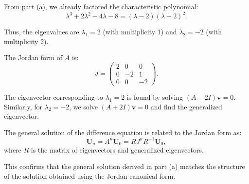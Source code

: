 \documentclass{article}
\renewcommand{\vec}[1]{\mathbf{#1}}
\begin{document}
\begin{enumerate}[(a)]
            From part (a), we already factored the characteristic polynomial:
            \[
            \lambda^3 + 2\lambda^2 - 4\lambda - 8 = (\lambda - 2)(\lambda + 2)^2.
            \]

            Thus, the eigenvalues are $\lambda_1 = 2$ (with multiplicity 1) and $\lambda_2 = -2$ (with multiplicity 2).

            The Jordan form of $A$ is:
            \[
            J = \begin{pmatrix}
            2 & 0 & 0 \\
            0 & -2 & 1 \\
            0 & 0 & -2
            \end{pmatrix}.
            \]

            The eigenvector corresponding to $\lambda_1 = 2$ is found by solving $(A - 2I)\vec{v} = 0$. Similarly, for $\lambda_2 = -2$, we solve $(A + 2I)\vec{v} = 0$ and find the generalized eigenvector.

            The general solution of the difference equation is related to the Jordan form as:
            \[
            \mathbf{U}_n = A^n \mathbf{U}_0 = RJ^n R^{-1} \mathbf{U}_0,
            \]
            where $R$ is the matrix of eigenvectors and generalized eigenvectors.

            This confirms that the general solution derived in part (a) matches the structure of the solution obtained using the Jordan canonical form.
\end{enumerate}
\end{document}
